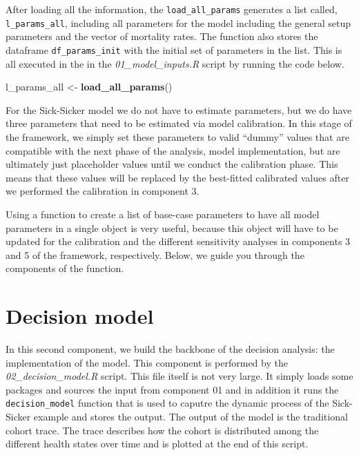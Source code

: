 \documentclass[]{book}
\newenvironment{Shaded}{\begin{snugshade}}{\end{snugshade}}
\newcommand{\KeywordTok}[1]{\textcolor[rgb]{0.13,0.29,0.53}{\textbf{#1}}}
\newcommand{\StringTok}[1]{\textcolor[rgb]{0.31,0.60,0.02}{#1}}
\newcommand{\NormalTok}[1]{#1}
\begin{document}
After loading all the information, the \texttt{load\_all\_params}
generates a list called, \texttt{l\_params\_all}, including all
parameters for the model including the general setup parameters and the
vector of mortality rates. The function also stores the dataframe
\texttt{df\_params\_init} with the initial set of parameters in the
list. This is all executed in the in the \emph{01\_model\_inputs.R}
script by running the code below.

\begin{Shaded}
\begin{Highlighting}[]
\NormalTok{l_params_all <-}\StringTok{ }\KeywordTok{load_all_params}\NormalTok{()}
\end{Highlighting}
\end{Shaded}

For the Sick-Sicker model we do not have to estimate parameters, but we
do have three parameters that need to be estimated via model
calibration. In this stage of the framework, we simply set these
parameters to valid ``dummy'' values that are compatible with the next
phase of the analysis, model implementation, but are ultimately just
placeholder values until we conduct the calibration phase. This means
that these values will be replaced by the best-fitted calibrated values
after we performed the calibration in component 3.

Using a function to create a list of base-case parameters to have all
model parameters in a single object is very useful, because this object
will have to be updated for the calibration and the different
sensitivity analyses in components 3 and 5 of the framework,
respectively. Below, we guide you through the components of the
function.

\chapter{Decision model}\label{simulation}

In this second component, we build the backbone of the decision
analysis: the implementation of the model. This component is performed
by the \emph{02\_decision\_model.R} script. This file itself is not very
large. It simply loads some packages and sources the input from
component 01 and in addition it runs the \texttt{decision\_model}
function that is used to caputre the dynamic process of the Sick-Sicker
example and stores the output. The output of the model is the
traditional cohort trace. The trace describes how the cohort is
distributed among the different health states over time and is plotted
at the end of this script.
\end{document}
